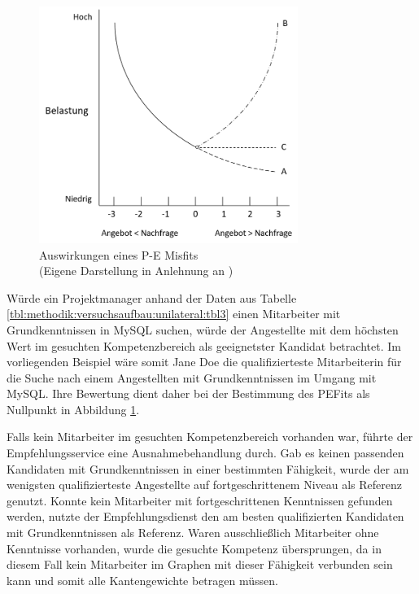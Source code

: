 \begin{figure}[h]
	\centering
	\includegraphics[width=0.75\textwidth]{gfx/ueberschuss_supply_motive.png}
	\caption[Auswirkungen eines P-E Misfits]{Auswirkungen eines P-E Misfits\\(Eigene Darstellung in Anlehnung an \cite[S. 23]{edwards:2008})}
	\label{fig:methodik:versuchsaufbau:unilateral:abb2}
\end{figure}

Würde ein Projektmanager anhand der Daten aus Tabelle \ref{tbl:methodik:versuchsaufbau:unilateral:tbl3} einen Mitarbeiter mit Grundkenntnissen in MySQL suchen, würde der Angestellte mit dem höchsten Wert im gesuchten Kompetenzbereich als geeignetster Kandidat betrachtet. Im vorliegenden Beispiel wäre somit Jane Doe die qualifizierteste Mitarbeiterin für die Suche nach einem Angestellten mit Grundkenntnissen im Umgang mit MySQL. Ihre Bewertung dient daher bei der Bestimmung des \acp{PEFit} als Nullpunkt in Abbildung \ref{fig:methodik:versuchsaufbau:unilateral:abb2}.

Falls kein Mitarbeiter im gesuchten Kompetenzbereich vorhanden war, führte der Empfehlungsservice eine Ausnahmebehandlung durch. Gab es keinen passenden Kandidaten mit Grundkenntnissen in einer bestimmten Fähigkeit, wurde der am wenigsten qualifizierteste Angestellte auf fortgeschrittenem Niveau als Referenz genutzt. Konnte kein Mitarbeiter mit fortgeschrittenen Kenntnissen gefunden werden, nutzte der Empfehlungsdienst den am besten qualifizierten Kandidaten mit Grundkenntnissen als Referenz. Waren ausschließlich Mitarbeiter ohne Kenntnisse vorhanden, wurde die gesuchte Kompetenz übersprungen, da in diesem Fall kein Mitarbeiter im Graphen mit dieser Fähigkeit verbunden sein kann und somit alle Kantengewichte \nullWert betragen müssen.

